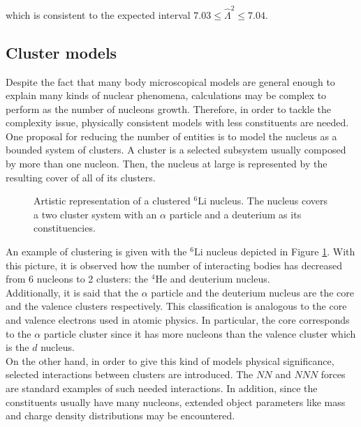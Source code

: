 \documentclass[openany]{book}
\begin{document}
which is consistent to the expected interval $7.03 \leq \hat \Lambda^2 \leq 7.04$.

\subsection{Cluster models} \label{sub:microscopical_cluster}

Despite the fact that many body microscopical models are general enough to explain many kinds of nuclear phenomena, calculations may be complex to perform as the number of nucleons growth. Therefore, in order to tackle the complexity issue, physically consistent models with less constituents are needed. \\

One proposal for reducing the number of entities is to model the nucleus as a bounded system of clusters. A cluster is a selected subsystem usually composed by more than one nucleon. Then, the nucleus at large is represented by the resulting cover of all of its clusters.   \\

\begin{figure}[H]
	
	\caption[Clustered $\mathrm{{}^{6}Li}$ nucleus]{Artistic representation of a clustered $\mathrm{{}^{6}Li}$ nucleus. The nucleus covers a two cluster system with an $\alpha$ particle and a deuterium as its constituencies.  }
	\label{fig:microscopical_cluster}
\end{figure}


An example of clustering is given with the $\mathrm{{}^{6}Li}$ nucleus depicted in Figure \ref{fig:microscopical_cluster}. With this picture, it is observed how the number of interacting bodies has decreased from 6 nucleons to 2 clusters: the  $\mathrm{{}^{4}He}$ and deuterium nucleus.  \\

Additionally, it is said that the $\alpha$ particle and the deuterium nucleus are the core and the valence clusters respectively. This classification is analogous to the core and valence electrons used in atomic physics. In particular, the core corresponds to the $\alpha$ particle cluster since it has more nucleons than the valence cluster which is the $d$ nucleus.  \\

On the other hand, in order to give this kind of models physical significance, selected interactions between clusters are introduced. The $NN$ and $NNN$ forces are standard examples of such needed interactions. In addition, since the constituents usually have many nucleons, extended object parameters like mass and charge density distributions may be encountered. \\
\end{document}
